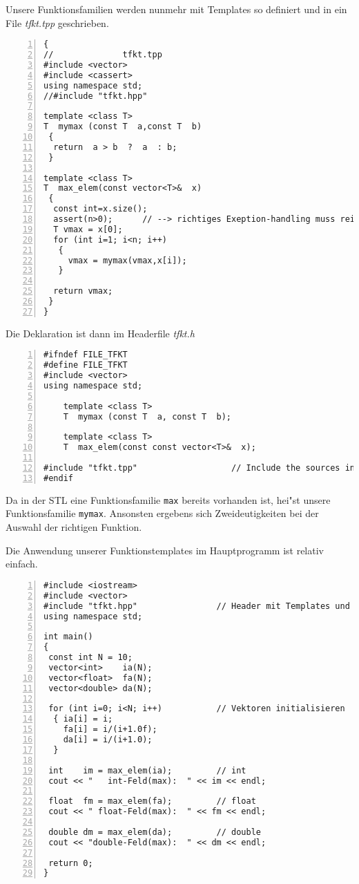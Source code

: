Unsere Funktionsfamilien werden nunmehr mit Templates so definiert und in ein File \emph{tfkt.tpp}
geschrieben.
%
\begin{lstlisting}[caption={Source: Templatefunktion.},label=lst:fkt_template_s,
basicstyle=\scriptsize,numbers=left, numberstyle=\tiny, stepnumber=2, numbersep=5pt]
{
//				tfkt.tpp
#include <vector>
#include <cassert>
using namespace std;
//#include "tfkt.hpp"

template <class T>
T  mymax (const T  a,const T  b)
 {
  return  a > b  ?  a  : b;
 }

template <class T>
T  max_elem(const vector<T>&  x)
 {
  const int=x.size();
  assert(n>0);		// --> richtiges Exeption-handling muss rein
  T vmax = x[0];
  for (int i=1; i<n; i++)
   {
     vmax = mymax(vmax,x[i]);
   }

  return vmax;
 }
}
\end{lstlisting}
%
Die Deklaration ist dann im Headerfile \emph{tfkt.h}
\begin{lstlisting}[caption={Header: Templatefunktion.},label=lst:fkt_template_h,
basicstyle=\scriptsize,numbers=left, numberstyle=\tiny, stepnumber=2, numbersep=5pt]
#ifndef FILE_TFKT
#define FILE_TFKT
#include <vector>
using namespace std;

    template <class T>
    T  mymax (const T  a, const T  b);

    template <class T>
    T  max_elem(const const vector<T>&  x);

#include "tfkt.tpp"                   // Include the sources in case of templates!!
#endif
\end{lstlisting}
%
Da in der STL eine Funktionsfamilie \verb|max| bereits vorhanden ist, hei"st unsere
Funktionsfamilie \verb|mymax|. Ansonsten ergebens sich Zweideutigkeiten bei der
Auswahl der richtigen Funktion.

Die Anwendung unserer Funktionstemplates im
Hauptprogramm
\label{code:A7main.cpp}
ist relativ einfach.

\begin{lstlisting}[caption={Templatefunktion anwenden.},label=lst:fkt_template_main,
basicstyle=\scriptsize,numbers=left, numberstyle=\tiny, stepnumber=2, numbersep=5pt]
#include <iostream>
#include <vector>
#include "tfkt.hpp"                // Header mit Templates und deren Sources
using namespace std;

int main()
{
 const int N = 10;
 vector<int>    ia(N);
 vector<float>  fa(N);
 vector<double> da(N);

 for (int i=0; i<N; i++)           // Vektoren initialisieren
  { ia[i] = i;
    fa[i] = i/(i+1.0f);
    da[i] = i/(i+1.0);
  }

 int    im = max_elem(ia);         // int
 cout << "   int-Feld(max):  " << im << endl;

 float  fm = max_elem(fa);         // float
 cout << " float-Feld(max):  " << fm << endl;

 double dm = max_elem(da);         // double
 cout << "double-Feld(max):  " << dm << endl;

 return 0;
}
\end{lstlisting}

